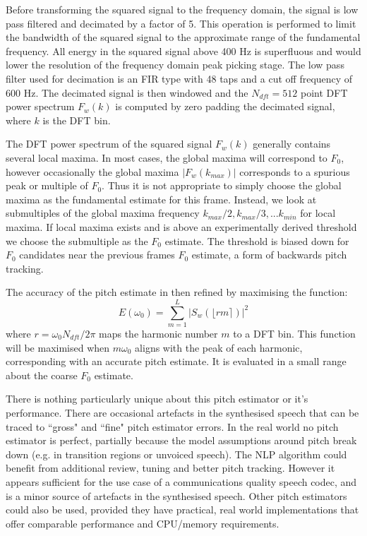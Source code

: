 \documentclass{article}
\begin{document}
{\begin{figure}[h]
\begin{center}
\begin{tikzpicture}[auto, node distance=2cm,>=triangle 45,x=1.0cm,y=1.0cm, align=center]
\end{tikzpicture}
\end{center}
\end{figure}

Before transforming the squared signal to the frequency domain, the signal is low pass filtered and decimated by a factor of 5. This operation is performed to limit the bandwidth of the squared signal to the approximate range of the fundamental frequency. All energy in the squared signal above 400 Hz is superfluous and would lower the resolution of the frequency domain peak picking stage. The low pass filter used for decimation is an FIR type with 48 taps and a cut off frequency of 600 Hz. The decimated signal is then windowed and the $N_{dft} = 512$ point DFT power spectrum $F_w(k)$ is computed by zero padding the decimated signal, where $k$ is the DFT bin.

The DFT power spectrum of the squared signal $F_w(k)$ generally contains several local maxima. In most cases, the global maxima will correspond to $F_0$, however occasionally the global maxima $|F_w(k_{max})|$ corresponds to a spurious peak or multiple of $F_0$. Thus it is not appropriate to simply choose the global maxima as the fundamental estimate for this frame. Instead, we look at submultiples of the global maxima frequency $k_{max}/2, k_{max}/3,... k_{min}$ for local maxima.  If local maxima exists and is above an experimentally derived threshold we choose the submultiple as the $F_0$ estimate.  The threshold is biased down for $F_0$ candidates near the previous frames $F_0$ estimate, a form of backwards pitch tracking.

The accuracy of the pitch estimate in then refined by maximising the function:
\begin{equation}
\label{eq:pitch_refinement}
E(\omega_0)=\sum_{m=1}^L|S_w(\lfloor r m \rceil)|^2
\end{equation}
where $r=\omega_0 N_{dft}/2 \pi$ maps the harmonic number $m$ to a DFT bin. This function will be maximised when $m \omega_0$ aligns with the peak of each harmonic, corresponding with an accurate pitch estimate.   It is evaluated in a small range about the coarse $F_0$ estimate.

There is nothing particularly unique about this pitch estimator or it's performance. There are occasional artefacts in the synthesised speech that can be traced to ``gross" and ``fine" pitch estimator errors.  In the real world no pitch estimator is perfect, partially because the model assumptions around pitch break down (e.g. in transition regions or unvoiced speech).  The NLP algorithm could benefit from additional review, tuning and better pitch tracking.  However it appears sufficient for the use case of a communications quality speech codec, and is a minor source of artefacts in the synthesised speech. Other pitch estimators could also be used, provided they have practical, real world implementations that offer comparable performance and CPU/memory requirements.

}
\end{document}
